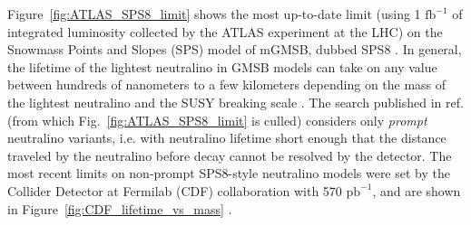 \documentclass[dissertation.tex]{subfiles}
\begin{document}

\marginpar{\textcolor{blue}{Removed CMS Moriond result}}Figure~\ref{fig:ATLAS_SPS8_limit} shows the most up-to-date limit (using 1 $\mbox{fb}^{-1}$ of integrated luminosity collected by the ATLAS experiment \cite{1748-0221-3-08-S08003} at the LHC) on the Snowmass Points and Slopes (SPS) model of mGMSB, dubbed SPS8 \cite{springerlink:10.1007/s10052-002-0949-3}.  In general, the lifetime of the lightest neutralino in GMSB models can take on any value between hundreds of nanometers to a few kilometers depending on the mass of the lightest neutralino and the SUSY breaking scale \cite{SUSY_primer}.  The search published in ref. \cite{Aad2012519} (from which Fig.~\ref{fig:ATLAS_SPS8_limit} is culled) considers only \textit{prompt} neutralino variants, i.e. with neutralino lifetime short enough that the distance traveled by the neutralino before decay cannot be resolved by the detector.  The most recent limits on non-prompt SPS8-style neutralino models were set by the Collider Detector at Fermilab (CDF) collaboration with 570 $\mbox{pb}^{-1}$, and are shown in Figure~\ref{fig:CDF_lifetime_vs_mass} \cite{PhysRevLett.104.011801}.
\end{document}
